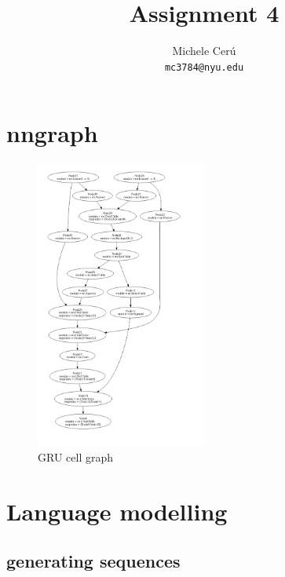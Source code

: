 \documentclass{article}
\title{Assignment 4}
\author{
  Michele Cer\'u
    \\
  \texttt{mc3784@nyu.edu} \\
}
\begin{document}

\maketitle


\section{nngraph}


\begin{figure}[ht!]
  \centering
  \includegraphics[width=0.50\textwidth]{GRU}
  \caption{ GRU cell graph\label{fig:gru_graph}}
\end{figure}


\section{Language modelling}

\subsection{generating sequences}
\end{document}
